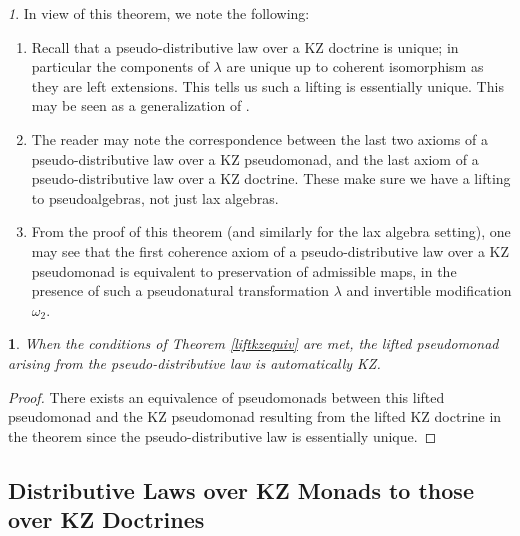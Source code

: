 \documentclass[a4paper,oneside,english]{amsart}
\numberwithin{equation}{section}
\numberwithin{figure}{section}
\theoremstyle{plain}
\theoremstyle{definition}
\theoremstyle{remark}
\newtheorem{rem}[thm]{\protect\remarkname}
\theoremstyle{definition}
\theoremstyle{plain}
\theoremstyle{plain}
\newtheorem{cor}[thm]{\protect\corollaryname}
\theoremstyle{plain}
\providecommand{\corollaryname}{Corollary}
\providecommand{\remarkname}{Remark}
\begin{document}
\begin{rem}
In view of this theorem, we note the following:
\begin{enumerate}
\item Recall that a pseudo-distributive law over a KZ doctrine is unique;
in particular the components of $\lambda$ are unique up to coherent
isomorphism as they are left extensions. This tells us such a lifting
is essentially unique. This may be seen as a generalization of \cite[Theorem 7.4]{marm2012}.
\item The reader may note the correspondence between the last two axioms
of a pseudo-distributive law over a KZ pseudomonad, and the last axiom
of a pseudo-distributive law over a KZ doctrine. These make sure we
have a lifting to pseudoalgebras, not just lax algebras.
\item From the proof of this theorem (and similarly for the lax algebra
setting), one may see that the first coherence axiom of a pseudo-distributive
law over a KZ pseudomonad is equivalent to preservation of admissible
maps, in the presence of such a pseudonatural transformation $\lambda$
and invertible modification $\omega_{2}$.
\end{enumerate}
\end{rem}

\begin{cor}
When the conditions of Theorem \ref{liftkzequiv} are met, the lifted
pseudomonad arising from the pseudo-distributive law is automatically
KZ.\end{cor}
\begin{proof}
There exists an equivalence of pseudomonads between this lifted pseudomonad
and the KZ pseudomonad resulting from the lifted KZ doctrine in the
theorem since the pseudo-distributive law is essentially unique.
\end{proof}

\subsection{Distributive Laws over KZ Monads to those over KZ Doctrines}
\end{document}

